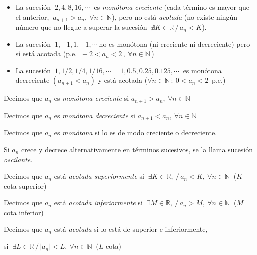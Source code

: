 \begin{miejemplo}

\begin{itemize}
\item La sucesión $\ 2,4,8,16,\cdots \ $ es \emph{monótona creciente} (cada término es mayor que el anterior, $\ a_{n+1}>a_n,\ \forall n \in \mathbb N$), pero no está \emph{acotada} (no existe ningún número que no llegue a superar la sucesión $\ \nexists K\in \mathbb R \, / \, a_n<K$).
\item La sucesión $\ 1,-1,1,-1,\cdots \ $no es monótona (ni creciente ni decreciente) pero sí está acotada (p.e. $\ -2<a_n<2\, , \  \forall  n\in \mathbb N \, $)	
\item La sucesión $\ 1,1/2,1/4,1/16,\cdots = 1,0.5,0.25,0.125,\cdots\ $ es monótona decreciente $(a_{n+1}<a_n)$ y está acotada ($\forall n\in \mathbb N\, : \ 0<a_n<2\, $ p.e.)
\end{itemize}
\end{miejemplo}

\begin{definition}[ Monotonía]

\vspace{2mm} Decimos que $a_n$ es \emph{monótona creciente} si $a_{n+1}>a_n,\ \forall n\in \mathbb N$	

\vspace{2mm} Decimos que $a_n$ es \emph{monótona decreciente} si $a_{n+1}<a_n,\ \forall n\in \mathbb N$	

\vspace{4mm} Decimos que $a_n$ es \emph{monótona} si lo es de modo creciente o decreciente.

\vspace{4mm} Si $a_n$ crece y decrece alternativamente en términos sucesivos, se la llama sucesión \emph{oscilante}.
\end{definition}

\begin{definition}[ Acotación]

\vspace{2mm} Decimos que $a_n$ está \emph{acotada superiormente} si $\ \exists K\in \mathbb R ,\ / \, a_n<K ,\ \forall n\in \mathbb N\ $ ($K$ cota superior)	 

\vspace{2mm} Decimos que $a_n$ está \emph{acotada inferiormente} si $\ \exists M\in \mathbb R ,\ / \, a_n>M ,\ \forall n\in \mathbb N\ $	 ($M$ cota inferior)
	

\vspace{4mm} Decimos que $a_n$ está \emph{acotada} si lo está de superior e inferiormente, 

\textcolor{gris}{si $\ \exists L\in \mathbb R \, / \, |a_n|<L,\ \forall n\in \mathbb N\ $} ($L$ cota)
\end{definition}

